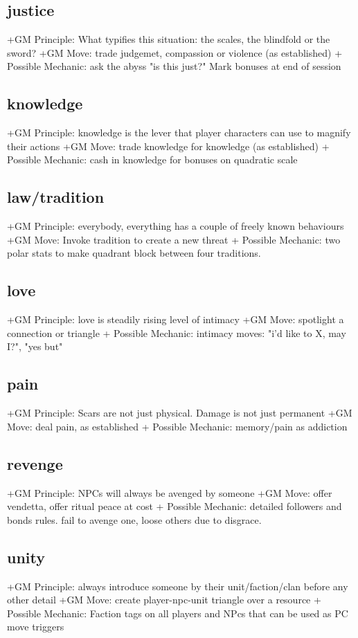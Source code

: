 \documentclass{tufte-handout}
\begin{document}
\begin{multicols}{2}
\subsection{justice}
+GM Principle: What typifies this situation: the scales, the blindfold or the sword?	
+GM Move: trade judgemet, compassion or violence (as established)
+ Possible Mechanic: ask the abyss "is this just?" Mark bonuses at end of session 

\subsection{knowledge }
+GM Principle: knowledge is the lever that player characters can use to magnify their actions	
+GM Move: trade knowledge for knowledge (as established)
+ Possible Mechanic: cash in knowledge for bonuses on quadratic scale

\subsection{law/tradition}
+GM Principle: everybody, everything has a couple of freely known behaviours
+GM Move: Invoke tradition to create a new threat
+ Possible Mechanic: two polar stats to make quadrant block between four traditions. 

\subsection{love}
+GM Principle:  love is steadily rising level of intimacy
+GM Move: spotlight a connection or triangle
+ Possible Mechanic: intimacy moves: 	 "i'd like to X, may I?", "yes but"

\subsection{pain}
+GM Principle: Scars are not just physical. Damage is not just permanent
+GM Move: deal pain, as established
+ Possible Mechanic: memory/pain as addiction 

\subsection{revenge}

+GM Principle: NPCs will always be avenged by someone
+GM Move:  offer vendetta, offer ritual peace at cost
+ Possible Mechanic: detailed followers and bonds rules. fail to avenge one, loose others due to disgrace.

\subsection{unity}
+GM Principle: always introduce someone by their unit/faction/clan before any other detail	
+GM Move: create player-npc-unit triangle over a resource 	
+ Possible Mechanic: Faction tags on all players and NPcs that can be used as PC move triggers



\end{multicols}
\end{document}
